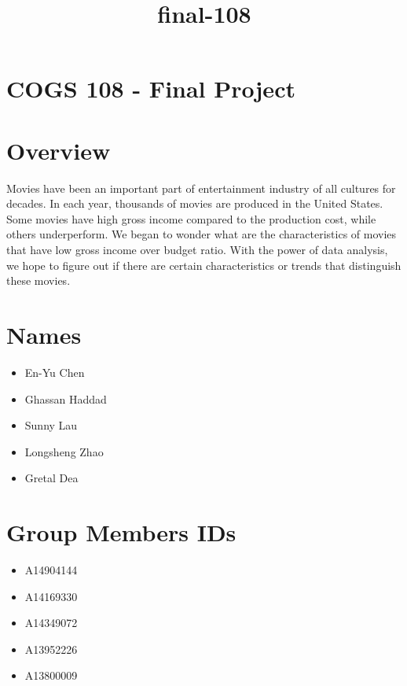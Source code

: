 \documentclass[11pt]{article}
\title{final-108}
\providecommand{\tightlist}{%
      \setlength{\itemsep}{0pt}\setlength{\parskip}{0pt}}
\begin{document}
    
    
    \maketitle
    
    

    
    \section{COGS 108 - Final Project}\label{cogs-108---final-project}

    \section{Overview}\label{overview}

    Movies have been an important part of entertainment industry of all
cultures for decades. In each year, thousands of movies are produced in
the United States. Some movies have high gross income compared to the
production cost, while others underperform. We began to wonder what are
the characteristics of movies that have low gross income over budget
ratio. With the power of data analysis, we hope to figure out if there
are certain characteristics or trends that distinguish these movies.

    \section{Names}\label{names}

\begin{itemize}
\tightlist
\item
  En-Yu Chen
\item
  Ghassan Haddad
\item
  Sunny Lau
\item
  Longsheng Zhao
\item
  Gretal Dea
\end{itemize}

    \section{Group Members IDs}\label{group-members-ids}

\begin{itemize}
\tightlist
\item
  A14904144
\item
  A14169330
\item
  A14349072
\item
  A13952226
\item
  A13800009
\end{itemize}
\end{document}
